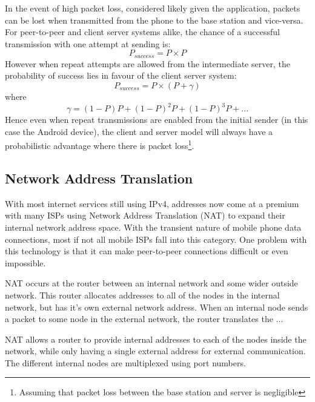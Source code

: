 In the event of high packet loss, considered likely given the application, packets can be lost when transmitted from the phone to the base station and vice-versa. For peer-to-peer and client server systems alike, the chance of a successful transmission with one attempt at sending is:
\begin{equation}
P_{success} = P \times P
\end{equation}
However when repeat attempts are allowed from the intermediate server, the probability of success lies in favour of the client server system:
\begin{equation}
P_{success} = P \times (P + \gamma)
\end{equation}
where
\begin{equation}
\gamma = (1-P)P + (1-P)^2P + (1-P)^3P + ...
\end{equation}
Hence even when repeat transmissions are enabled from the initial sender (in this case the Android device), the client and server model will always have a probabilistic advantage where there is packet loss\footnote{Assuming that packet loss between the base station and server is negligible}.

\subsection{Network Address Translation}
\label{nat}

With most internet services still using IPv4, addresses now come at a premium with many ISPs using Network Address Translation (NAT) to expand their internal network address space. With the transient nature of mobile phone data connections, most if not all mobile ISPs fall into this category. One problem with this technology is that it can make peer-to-peer connections difficult or even impossible.

NAT occurs at the router between an internal network and some wider outside network. This router allocates addresses to all of the nodes in the internal network, but has it's own external network address. When an internal node sends a packet to some node in the external network, the router translates the ...

NAT allows a router to provide internal addresses to each of the nodes inside the network, while only having a single external address for external communication. The different internal nodes are multiplexed using port numbers.

